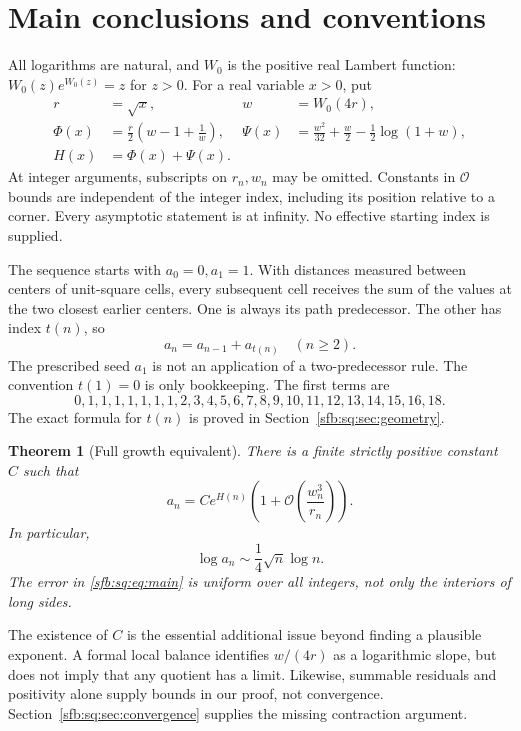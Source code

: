 \documentclass[11pt]{article}
\newtheorem{theorem}{Theorem}[section]
\theoremstyle{remark}\newtheorem{remark}[theorem]{Remark}
\newcommand{\OO}{\mathcal O}
\begin{document}
\section{Main conclusions and conventions}\label{sfb:sq:sec:main}
All logarithms are natural, and $W_0$ is the positive real Lambert function:
$W_0(z)e^{W_0(z)}=z$ for $z>0$. For a real variable $x>0$, put
\begin{align}
 r&=\sqrt x,&w&=W_0(4r),\label{sfb:sq:eq:rw}\\
 \Phi(x)&=\frac r2\left(w-1+\frac1w\right),&
 \Psi(x)&=\frac{w^2}{32}+\frac w2-\frac12\log(1+w),\label{sfb:sq:eq:phipsi}\\
 H(x)&=\Phi(x)+\Psi(x).&&\label{sfb:sq:eq:H}
\end{align}
At integer arguments, subscripts on $r_n,w_n$ may be omitted. Constants in $\OO$ bounds are independent of the integer index, including its position relative to a corner. Every asymptotic statement is at infinity. No effective starting index is supplied.

The sequence starts with $a_0=0,a_1=1$. With distances measured between centers of unit-square cells, every subsequent cell receives the sum of the values at the two closest earlier centers. One is always its path predecessor. The other has index $t(n)$, so
\begin{equation}\label{sfb:sq:eq:recurrence}
 a_n=a_{n-1}+a_{t(n)}\quad(n\ge2).
\end{equation}
The prescribed seed $a_1$ is not an application of a two-predecessor rule. The convention $t(1)=0$ is only bookkeeping. The first terms are
\[
 0,1,1,1,1,1,1,1,2,3,4,5,6,7,8,9,10,11,12,13,14,15,16,18.
\]
The exact formula for $t(n)$ is proved in Section~\ref{sfb:sq:sec:geometry}.

\begin{theorem}[Full growth equivalent]\label{sfb:sq:thm:main}
There is a finite strictly positive constant $C$ such that
\begin{equation}\label{sfb:sq:eq:main}
 a_n=C e^{H(n)}\left(1+\OO\!\left(\frac{w_n^3}{r_n}\right)\right).
\end{equation}
In particular,
\begin{equation}\label{sfb:sq:eq:logleading}
 \log a_n\sim\frac14\sqrt n\log n.
\end{equation}
The error in \eqref{sfb:sq:eq:main} is uniform over all integers, not only the interiors of long sides.
\end{theorem}

The existence of $C$ is the essential additional issue beyond finding a plausible exponent. A formal local balance identifies $w/(4r)$ as a logarithmic slope, but does not imply that any quotient has a limit. Likewise, summable residuals and positivity alone supply bounds in our proof, not convergence. Section~\ref{sfb:sq:sec:convergence} supplies the missing contraction argument.
\end{document}
